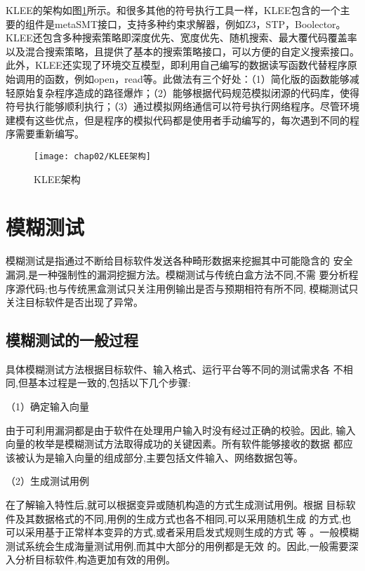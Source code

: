 KLEE的架构如图\ref{KLEE架构}所示。和很多其他的符号执行工具一样，KLEE包含的一个主要的组件是metaSMT接口，支持多种约束求解器，例如Z3，STP，Boolector。KLEE还包含多种搜索策略即深度优先、宽度优先、随机搜索、最大覆代码覆盖率以及混合搜索策略，且提供了基本的搜索策略接口，可以方便的自定义搜索接口。此外，KLEE还实现了环境交互模型，即利用自己编写的数据读写函数代替程序原始调用的函数，例如open，read等。此做法有三个好处：（1）简化版的函数能够减轻原始复杂程序造成的路径爆炸；（2）能够根据代码规范模拟闭源的代码库，使得符号执行能够顺利执行；（3）通过模拟网络通信可以符号执行网络程序。尽管环境建模有这些优点，但是程序的模拟代码都是使用者手动编写的，每次遇到不同的程序需要重新编写。

\begin{figure}[h]
\begin{center}
\texttt{[image: chap02/KLEE架构]}
\end{center}
\caption{KLEE架构}
\label{KLEE架构}
\end{figure}
\section{模糊测试}
模糊测试是指通过不断给目标软件发送各种畸形数据来挖掘其中可能隐含的
安全漏洞,是一种强制性的漏洞挖掘方法。模糊测试与传统白盒方法不同,不需
要分析程序源代码;也与传统黑盒测试只关注用例输出是否与预期相符有所不同,
模糊测试只关注目标软件是否出现了异常。

\subsection{模糊测试的一般过程}
具体模糊测试方法根据目标软件、输入格式、运行平台等不同的测试需求各
不相同,但基本过程是一致的,包括以下几个步骤:

（1）确定输入向量

由于可利用漏洞都是由于软件在处理用户输入时没有经过正确的校验。因此,
输入向量的枚举是模糊测试方法取得成功的关键因素。所有软件能够接收的数据
都应该被认为是输入向量的组成部分,主要包括文件输入、网络数据包等。

（2）生成测试用例

在了解输入特性后,就可以根据变异或随机构造的方式生成测试用例。根据
目标软件及其数据格式的不同,用例的生成方式也各不相同,可以采用随机生成
的方式,也可以采用基于正常样本变异的方式,或者采用启发式规则生成的方式
等 。一般模糊测试系统会生成海量测试用例,而其中大部分的用例都是无效
的。因此,一般需要深入分析目标软件,构造更加有效的用例。

